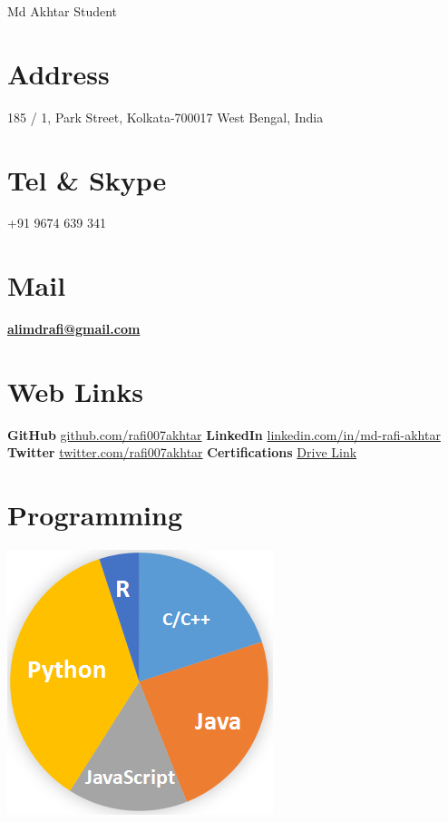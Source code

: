 \documentclass[]{friggeri-cv}
\begin{document}
\header {} {Md Akhtar}
      {Student}
      

\begin{aside}
  \section{Address}
    185 / 1, Park Street, Kolkata-700017
    West Bengal, India
    ~
  \section{Tel \& Skype}
    +91 9674 639 341
    ~
  \section{Mail}
    \href{mailto:alimdrafi.com}{\textbf{alimdrafi@gmail.com}}
    ~
  \section{Web Links}
    \textbf{GitHub} \href{https://github.com/rafi007akhtar}{github.com/rafi007akhtar}
    \textbf{LinkedIn} \href{https://www.linkedin.com/in/md-rafi-akhtar}{linkedin.com/in/md-rafi-akhtar}
    \textbf{Twitter} \href{https://twitter.com/rafi007akhtar}{twitter.com/rafi007akhtar}
    \textbf{Certifications}
    \href{https://drive.google.com/open?id=1yXkhjvAwEwfuUrkH_Ks33mNrBGWDfhWL}{Drive Link}
    ~
  \section{Programming}
    \includegraphics[scale=0.5]{img/languages.png}
    ~

\end{aside}
\end{document}
